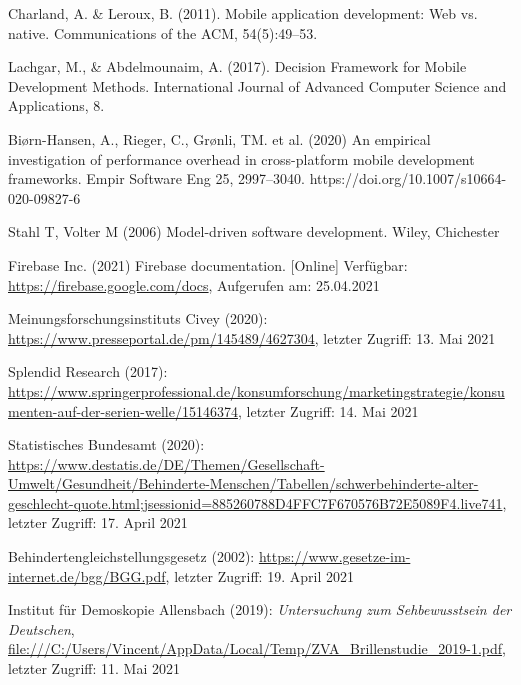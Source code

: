 \documentclass[11pt,a4paper]{article}
\begin{document}
\begin{itemize}
	 Charland, A. \& Leroux, B. (2011). Mobile application development: Web vs. native. Communications of the ACM, 54(5):49–53.

	 Lachgar, M., \& Abdelmounaim, A. (2017). Decision Framework for Mobile Development Methods. International Journal of Advanced Computer Science and Applications, 8.

	 Biørn-Hansen, A., Rieger, C., Grønli, TM. et al. (2020) An empirical investigation of performance overhead in cross-platform mobile development frameworks. Empir Software Eng 25, 2997–3040. https://doi.org/10.1007/s10664-020-09827-6

	 Stahl T, Volter M (2006) Model-driven software development. Wiley, Chichester

	 Firebase Inc. (2021) Firebase documentation. [Online] Verfügbar: \url{https://firebase.google.com/docs}, Aufgerufen am: 25.04.2021

     Meinungsforschungsinstituts Civey (2020):  \url{https://www.presseportal.de/pm/145489/4627304}, letzter Zugriff: 13. Mai 2021

     Splendid Research (2017): \url{https://www.springerprofessional.de/konsumforschung/marketingstrategie/konsumenten-auf-der-serien-welle/15146374}, letzter Zugriff: 14. Mai 2021

     Statistisches Bundesamt (2020): \url{https://www.destatis.de/DE/Themen/Gesellschaft-Umwelt/Gesundheit/Behinderte-Menschen/Tabellen/schwerbehinderte-alter-geschlecht-quote.html;jsessionid=885260788D4FFC7F670576B72E5089F4.live741}, letzter Zugriff: 17. April 2021

     Behindertengleichstellungsgesetz (2002): \url{https://www.gesetze-im-internet.de/bgg/BGG.pdf}, letzter Zugriff: 19. April 2021

     Institut für Demoskopie Allensbach (2019): \textit{Untersuchung zum Sehbewusstsein der Deutschen},  \url{file:///C:/Users/Vincent/AppData/Local/Temp/ZVA_Brillenstudie_2019-1.pdf}, letzter Zugriff: 11. Mai 2021
\end{itemize}
\end{document}
